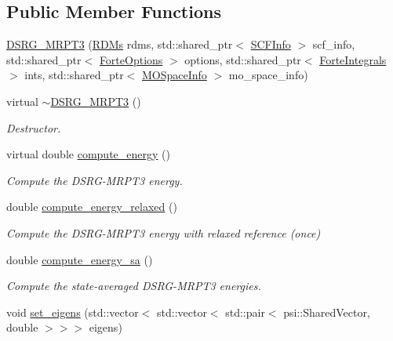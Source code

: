 \subsection*{Public Member Functions}
\begin{DoxyCompactItemize}
\item 
\mbox{\hyperlink{classforte_1_1_d_s_r_g___m_r_p_t3_a411038a819da24f5ffb4db0cf621a742}{D\+S\+R\+G\+\_\+\+M\+R\+P\+T3}} (\mbox{\hyperlink{classforte_1_1_r_d_ms}{R\+D\+Ms}} rdms, std\+::shared\+\_\+ptr$<$ \mbox{\hyperlink{classforte_1_1_s_c_f_info}{S\+C\+F\+Info}} $>$ scf\+\_\+info, std\+::shared\+\_\+ptr$<$ \mbox{\hyperlink{classforte_1_1_forte_options}{Forte\+Options}} $>$ options, std\+::shared\+\_\+ptr$<$ \mbox{\hyperlink{classforte_1_1_forte_integrals}{Forte\+Integrals}} $>$ ints, std\+::shared\+\_\+ptr$<$ \mbox{\hyperlink{classforte_1_1_m_o_space_info}{M\+O\+Space\+Info}} $>$ mo\+\_\+space\+\_\+info)
\item 
virtual \mbox{\hyperlink{classforte_1_1_d_s_r_g___m_r_p_t3_ae2419fb8f82089098a086f62baff4816}{$\sim$\+D\+S\+R\+G\+\_\+\+M\+R\+P\+T3}} ()
\begin{DoxyCompactList}\small\item\em Destructor. \end{DoxyCompactList}\item 
virtual double \mbox{\hyperlink{classforte_1_1_d_s_r_g___m_r_p_t3_a48a25a952206690bcf8125e583576052}{compute\+\_\+energy}} ()
\begin{DoxyCompactList}\small\item\em Compute the D\+S\+R\+G-\/\+M\+R\+P\+T3 energy. \end{DoxyCompactList}\item 
double \mbox{\hyperlink{classforte_1_1_d_s_r_g___m_r_p_t3_ac01edeb17737755a3b025459a792aad4}{compute\+\_\+energy\+\_\+relaxed}} ()
\begin{DoxyCompactList}\small\item\em Compute the D\+S\+R\+G-\/\+M\+R\+P\+T3 energy with relaxed reference (once) \end{DoxyCompactList}\item 
double \mbox{\hyperlink{classforte_1_1_d_s_r_g___m_r_p_t3_a2b3a92749aae957f93d5f9cda22d0716}{compute\+\_\+energy\+\_\+sa}} ()
\begin{DoxyCompactList}\small\item\em Compute the state-\/averaged D\+S\+R\+G-\/\+M\+R\+P\+T3 energies. \end{DoxyCompactList}\item 
void \mbox{\hyperlink{classforte_1_1_d_s_r_g___m_r_p_t3_a20ec1fcadc9b1e3cb8d21df9a86fa055}{set\+\_\+eigens}} (std\+::vector$<$ std\+::vector$<$ std\+::pair$<$ psi\+::\+Shared\+Vector, double $>$$>$$>$ eigens)

\end{DoxyCompactItemize}
